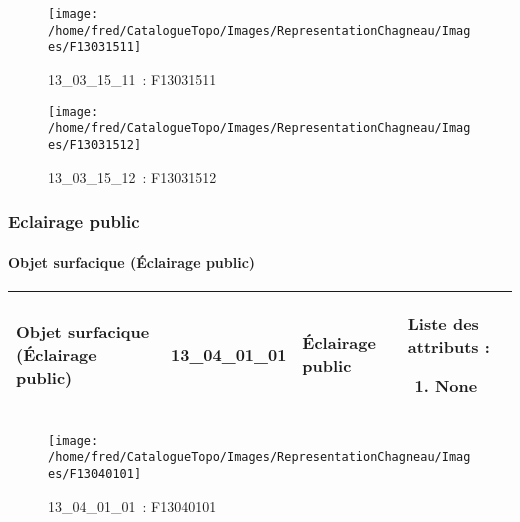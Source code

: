 \documentclass[12pt,titlepage,oneside]{book}
\begin{document}
\begin{figure}[h!]
\begin{minipage}[t]{3cm}
    \begin{center}
      \texttt{[image: /home/fred/CatalogueTopo/Images/RepresentationChagneau/Images/F13031511]}
      \caption[~13\_03\_15\_11]{\small{13\_03\_15\_11~:} \tiny{F13031511}}\label{F13031511}
    \end{center}
  \end{minipage}
  \begin{minipage}[t]{3cm}
    \begin{center}
      \texttt{[image: /home/fred/CatalogueTopo/Images/RepresentationChagneau/Images/F13031512]}
      \caption[~13\_03\_15\_12]{\small{13\_03\_15\_12~:} \tiny{F13031512}}\label{F13031512}
    \end{center}
  \end{minipage}
\end{figure}

\subsubsection{\large Eclairage public}
\paragraph{Objet surfacique (Éclairage public)}
\noindent
\vspace{\baselineskip}

\renewcommand{\arraystretch}{1.2}
\begin{supertabular}{|p{10cm}|c|p{13cm}|p{12cm}|}
 Objet surfacique (Éclairage public) & 13\_04\_01\_01 & Éclairage public & Liste des attributs :
\begin{enumerate}
  \item None\end{enumerate}
\\
\hline
\end{supertabular}
\begin{figure}[h!]
  \hfill         %
  \begin{minipage}[t]{3cm}
    \begin{center}
      \texttt{[image: /home/fred/CatalogueTopo/Images/RepresentationChagneau/Images/F13040101]}
      \caption[~13\_04\_01\_01]{\small{13\_04\_01\_01~:} \tiny{F13040101}}\label{F13040101}
    \end{center}
  \end{minipage}
\end{figure}
\end{document}
